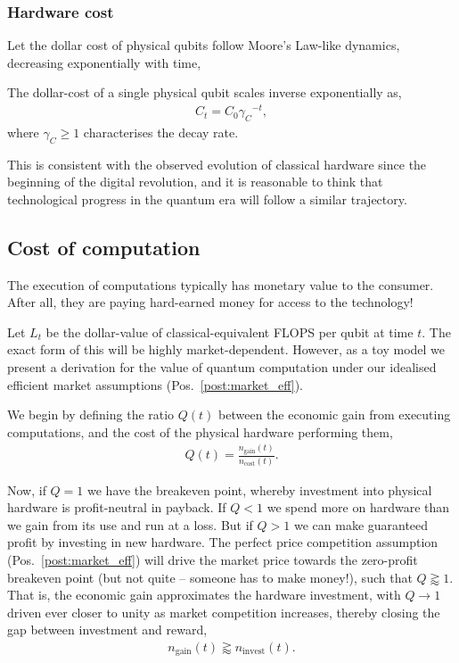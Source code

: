 \subsubsection{Hardware cost} 

Let the dollar cost of physical qubits follow Moore's Law-like dynamics, decreasing exponentially with time,
\begin{postulate}\label{post:hardware_cost}
The dollar-cost of a single physical qubit scales inverse exponentially as,
\begin{align}
	C_t = C_0 {\gamma_C}^{-t},
\end{align}
where \mbox{$\gamma_C\geq 1$} characterises the decay rate.
\end{postulate}

This is consistent with the observed evolution of classical hardware since the beginning of the digital revolution, and it is reasonable to think that technological progress in the quantum era will follow a similar trajectory.

%
%

\subsection{Cost of computation}\label{sec:cost_of_comp} 

The execution of computations typically has monetary value to the consumer. After all, they are paying hard-earned money for access to the technology!

Let $L_t$ be the dollar-value of classical-equivalent FLOPS per qubit at time $t$. The exact form of this will be highly market-dependent. However, as a toy model we present a derivation for the value of quantum computation under our idealised efficient market assumptions (Pos.~\ref{post:market_eff}).

We begin by defining the ratio $Q(t)$ between the economic gain from executing computations, and the cost of the physical hardware performing them,
\begin{align}
Q(t)=\frac{n_\text{gain}(t)}{n_\text{cost}(t)}.
\end{align}

Now, if \mbox{$Q=1$} we have the breakeven point, whereby investment into physical hardware is profit-neutral in payback. If \mbox{$Q<1$} we spend more on hardware than we gain from its use and run at a loss. But if \mbox{$Q>1$} we can make guaranteed profit by investing in new hardware. The perfect price competition assumption (Pos.~\ref{post:market_eff}) will drive the market price towards the zero-profit breakeven point (but not quite -- someone has to make money!), such that \mbox{$Q\gtrapprox 1$}. That is, the economic gain approximates the hardware investment, with \mbox{$Q\to 1$} driven ever closer to unity as market competition increases, thereby closing the gap between investment and reward,
\begin{align} \label{sec:gain_eq_invest}
	n_\text{gain}(t) \gtrapprox n_\text{invest}(t).
\end{align}

